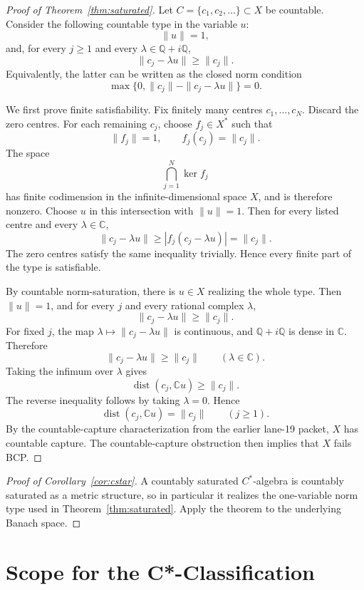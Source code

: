 \documentclass[11pt]{article}
\newcommand{\C}{\mathbb C}
\newcommand{\Q}{\mathbb Q}
\newcommand{\dist}{\operatorname{dist}}
\begin{document}
\begin{proof}[Proof of Theorem~\ref{thm:saturated}]
Let \(C=\{c_1,c_2,\ldots\}\subset X\) be countable.  Consider the following
countable type in the variable \(u\):
\[
        \|u\|=1,
\]
and, for every \(j\ge1\) and every \(\lambda\in\Q+i\Q\),
\[
        \|c_j-\lambda u\|\ge \|c_j\|.
\]
Equivalently, the latter can be written as the closed norm condition
\[
        \max\{0,\|c_j\|-\|c_j-\lambda u\|\}=0.
\]

We first prove finite satisfiability.  Fix finitely many centres
\(c_1,\ldots,c_N\).  Discard the zero centres.  For each remaining \(c_j\),
choose \(f_j\in X^*\) such that
\[
        \|f_j\|=1,\qquad f_j(c_j)=\|c_j\|.
\]
The space
\[
        \bigcap_{j=1}^N\ker f_j
\]
has finite codimension in the infinite-dimensional space \(X\), and is
therefore nonzero.  Choose \(u\) in this intersection with \(\|u\|=1\).  Then
for every listed centre and every \(\lambda\in\C\),
\[
        \|c_j-\lambda u\|
        \ge
        |f_j(c_j-\lambda u)|
        =
        \|c_j\|.
\]
The zero centres satisfy the same inequality trivially.  Hence every finite
part of the type is satisfiable.

By countable norm-saturation, there is \(u\in X\) realizing the whole type.
Then \(\|u\|=1\), and for every \(j\) and every rational complex
\(\lambda\),
\[
        \|c_j-\lambda u\|\ge\|c_j\|.
\]
For fixed \(j\), the map \(\lambda\mapsto \|c_j-\lambda u\|\) is continuous,
and \(\Q+i\Q\) is dense in \(\C\).  Therefore
\[
        \|c_j-\lambda u\|\ge\|c_j\|\qquad(\lambda\in\C).
\]
Taking the infimum over \(\lambda\) gives
\[
        \dist(c_j,\C u)\ge\|c_j\|.
\]
The reverse inequality follows by taking \(\lambda=0\).  Hence
\[
        \dist(c_j,\C u)=\|c_j\|\qquad(j\ge1).
\]
By the countable-capture characterization from the earlier lane-19 packet,
\(X\) has countable capture.  The countable-capture obstruction then implies
that \(X\) fails BCP.
\end{proof}

\begin{proof}[Proof of Corollary~\ref{cor:cstar}]
A countably saturated \(C^*\)-algebra is countably saturated as a metric
structure, so in particular it realizes the one-variable norm type used in
Theorem~\ref{thm:saturated}.  Apply the theorem to the underlying Banach
space.
\end{proof}

\section*{Scope for the C*-Classification}
\end{document}
